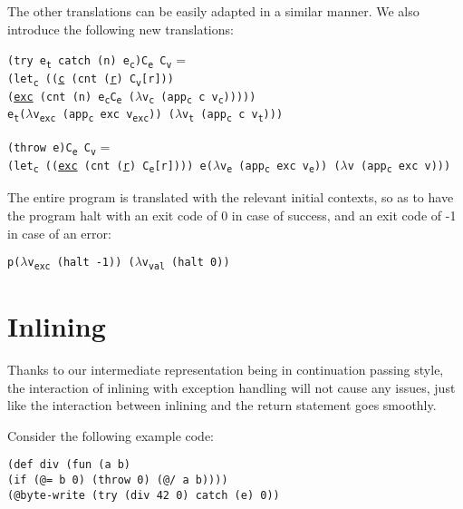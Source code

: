 \documentclass[12pt,a4paper]{article}
\newcommand{\cl}[3]{\texttt{\textcolor{OliveGreen}{#1}#2\textcolor{OliveGreen}{#3}}}
\newcommand{\cps}[3]{\texttt{\textcolor{BurntOrange}{#1}#2\textcolor{BurntOrange}{#3}}}
\newcommand{\ts}[2]{#1\textsubscript{#2}}
\newcommand{\code}[1]{\texttt{#1}}
\newcommand{\tran}[3]{\code{\textlbrackdbl #1\textrbrackdbl #2 #3}}
\newcommand{\cv}{\ts{C}{v}}
\newcommand{\ce}{\ts{C}{e}}
\newcommand{\letc}{\ts{let}{c}}
\newcommand{\appc}{\ts{app}{c}}
\begin{document}
The other translations can be easily adapted in a similar manner. We also introduce the following new translations:
\begin{description}
\item \tran{\cl{(try }{\ts{e}{t}}{} \cl{catch (}{n}{)} \cl{}{\ts{e}{c}}{)}}{\ce}{\cv} = \\
\cps{(\letc~}{\cps{(}{(\underline{c} \cps{(cnt }{(\underline{r}) \cv[r]}{)}) \\\hspace*{3.4em}(\underline{exc} \cps{(cnt }{(n) \tran{\ts{e}{c}}{\ce}{($\lambda$\ts{v}{c} \cps{(\appc~}{c \ts{v}{c}}{)})}}{)})}{)} \\\hspace*{1em}\tran{\ts{e}{t}}{($\lambda$\ts{v}{exc} \cps{(\appc~}{exc \ts{v}{exc}}{)})}{($\lambda$\ts{v}{t} \cps{(\appc~}{c \ts{v}{t}}{)})}}{)}
\item \tran{\cl{(throw }{e}{)}}{\ce}{\cv} = \\\cps{(\letc~}{\cps{(}{(\underline{exc} \cps{(cnt }{(\underline{r}) \ce[r]}{)})}{)} \tran{e}{($\lambda$\ts{v}{e} \cps{(\appc~}{exc \ts{v}{e}}{)})}{($\lambda$v \cps{(\appc~}{exc v}{)})}}{)}
\end{description}

The entire program is translated with the relevant initial contexts, so as to have the program halt with an exit code of 0 in case of success, and an exit code of -1 in case of an error:

\begin{center}
\tran{p}{($\lambda$\ts{v}{exc} \cps{(halt }{-1}{)})}{($\lambda$\ts{v}{val} \cps{(halt }{0}{)})}
\end{center}

\section{Inlining}

Thanks to our intermediate representation being in continuation passing style, the interaction of inlining with exception handling will not cause any issues, just like the interaction between inlining and the return statement goes smoothly.

Consider the following example code:

\cl{(def }{div \cl{(fun }{(a b)\\
\hspace*{7em}\cl{(if }{\cl{(@}{= b 0}{)} \cl{(throw }{0}{)} \cl{(@}{/ a b}{)}}{)}}{)}}{)}\\
\cl{(@}{byte-write \cl{(try }{(div 42 0)}{} \cl{catch }{(e) 0}{)}}{)}
\end{document}
